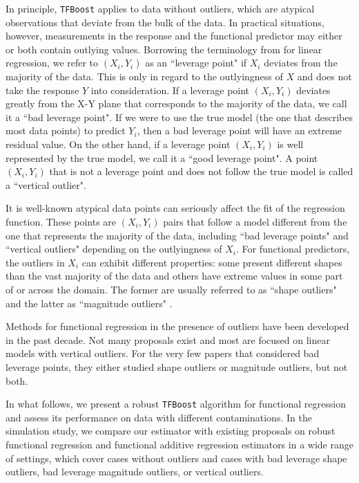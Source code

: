 \documentclass{article}
\begin{document}
In principle, \texttt{TFBoost} applies to data without  outliers, which are atypical observations  that deviate from the bulk of the data.  In practical situations, however,  measurements in the response and the functional predictor may either or both contain outlying values. Borrowing the terminology from \cite{rousseeuw1990unmasking} for linear regression, we refer to $(X_i, Y_i)$ as an ``leverage point"  if $X_i$ deviates from the majority of the data. This is only in regard to the outlyingness of $X$ and does not take the response $Y$ into consideration. If a leverage point $(X_i, Y_i)$ deviates greatly from the X-Y plane that  corresponds to the majority of the data, we call it a ``bad leverage point".  If we were to use the true model (the one that describes most data points) to predict $Y_i$, then a bad leverage point will have an extreme residual value.  On the other hand, if a leverage point  $(X_i, Y_i)$ is well represented by the true model, we call it a ``good leverage point".  A point $(X_i, Y_i)$ that is not a leverage point and does not follow the true model is called a ``vertical outlier". 

It is well-known atypical data points can seriously  affect the fit of the regression function. These points are $(X_i, Y_i)$ pairs that follow a model different from the  one that represents the majority of the data, including ``bad leverage points" and ``vertical outliers" depending on the outlyingness of $X_i$.  For functional predictors, the outliers in $X_i$ can exhibit  different properties: some present different shapes than the vast majority of the data and others have extreme values in some part of or across the domain.   The former are usually referred to as ``shape outliers" and the latter as ``magnitude outliers" \citep{hyndman2010rainbow, arribas2014shape, dai2020functional}.
 

Methods for functional regression in the presence of outliers have been developed in the past decade. Not many proposals exist and most are focused on linear models with vertical outliers. For the very few papers that considered bad leverage points, they either studied shape outliers or magnitude outliers, but not both. 


In what follows, we present a robust \texttt{TFBoost} algorithm for functional regression and assess its performance on data with different contaminations.    In the simulation study, we compare our estimator  with existing proposals on robust functional regression and functional additive regression estimators in a wide range of settings, which   cover cases without outliers and cases with bad leverage shape outliers,  bad leverage magnitude outliers, or vertical outliers. 
 
\end{document}
